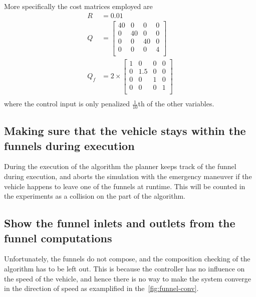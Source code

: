 More specifically the cost matrices employed are
\begin{align*}
  R &= 0.01 \\
  Q &= \begin{bmatrix}
    40 & 0 & 0 & 0 \\
    0 & 40 & 0 & 0 \\
    0 & 0 & 40 & 0 \\
    0 & 0 & 0 & 4 \\
  \end{bmatrix}
  \\
  Q_{f} &=
          2\times
          \begin{bmatrix}
            1 & 0 & 0 & 0 \\
            0 & 1.5 & 0 & 0 \\
            0 & 0 & 1 & 0 \\
            0 & 0 & 0 & 1 \\
          \end{bmatrix}
  \\
\end{align*}
where the control input is only penalized \(\frac{1}{10}\)th of the other
variables.

\subsection{Making sure that the vehicle stays within the funnels during
  execution}

During the execution of the \rrtfunnel{} algorithm the planner keeps track of
the funnel during execution, and aborts the simulation with the emergency
maneuver if the vehicle happens to leave one of the funnels at runtime. This
will be counted in the experiments as a collision on the part of the
\rrtfunnel{} algorithm.

\subsection{Show the funnel inlets and outlets from the funnel computations}

Unfortunately, the funnels do not compose, and the composition checking of the
algorithm has to be left out. This is because the controller has no influence on
the speed of the vehicle, and hence there is no way to make the system converge
in the direction of speed as examplified in the~\cref{fig:funnel-conv}.

